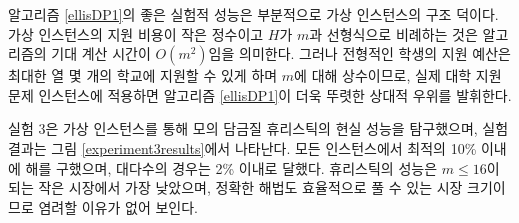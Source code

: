\documentclass[11pt]{article} %
\newif\ifen
\theoremstyle{definition}
\theoremstyle{definition}
\begin{document}
알고리즘 \ref{ellisDP1}의 좋은 실험적 성능은 부분적으로 가상 인스턴스의 구조 덕이다. 가상 인스턴스의 지원 비용이 작은 정수이고 $H$가 $m$과 선형식으로 비례하는 것은 알고리즘의 기대 계산 시간이 $O(m^2)$임을 의미한다. 그러나 전형적인 학생의 지원 예산은 최대한 열 몇 개의 학교에 지원할 수 있게 하며 $m$에 대해 상수이므로, 실제 대학 지원 문제 인스턴스에 적용하면 알고리즘 \ref{ellisDP1}이 더욱 뚜렷한 상대적 우위를 발휘한다. 
\fi

\ifen
The results of Experiment 3, which evaluated the performance of the simulated-annealing heuristic in our synthetic instances, are plotted in Figure \ref{experiment3results}. In the every instance, the heuristic found a solution within 10 percent of optimality, and in the vast majority of instances, it was within 2 percent of optimality. The heuristic performs most poorly in small markets of size $m \leq 16$, but as exact algorithms are tractable at this scale, this result presents no cause for concern.
\else
실험 3은 가상 인스턴스를 통해 모의 담금질 휴리스틱의 현실 성능을 탐구했으며, 실험 결과는 그림 \ref{experiment3results}에서 나타난다. 모든 인스턴스에서 최적의 10\% 이내에 해를 구했으며, 대다수의 경우는 2\% 이내로 달했다. 휴리스틱의 성능은 $m \leq 16$이 되는 작은 시장에서 가장 낮았으며, 정확한 해법도 효율적으로 풀 수 있는 시장 크기이므로 염려할 이유가 없어 보인다.
\fi





\newcommand{\lastptofcaption}{\ifen
For each value of $m$, \nmarkets~markets were generated, and the computation time was recorded as fastest of three repetitions of the algorithm. The table shows the average time (standard deviation) over the \nmarkets~instances.
\else 각 $m$에 대해 \nmarkets 개의 시장을 생성했으며 알고리즘을 3번 반복하여 그중 최소 계산 시간을 기록했다. 표에서 \nmarkets 개의 인스턴스에 대한 평균 (표준편차) 시간이 나타난다.\fi}
\end{document}
